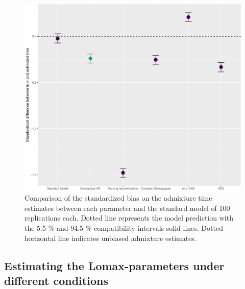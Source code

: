 \documentclass[]{article}
\begin{document}
\begin{figure}
\centering
\includegraphics{Admixture_Time_Inference_Paper_Draft_files/figure-latex/fig3-1.pdf}
\caption{\label{fig:fig3} Comparison of the standardized bias on the
admixture time estimates between each parameter and the standard model
of 100 replications each. Dotted line represents the model prediction
with the 5.5 \% and 94.5 \% compatibility intervals solid lines. Dotted
horizontal line indicates unbiased admixture estimates.}
\end{figure}

\subsection{Estimating the Lomax-parameters under different conditions}\label{estimating the Lomax-parameters under different conditions}
\end{document}
